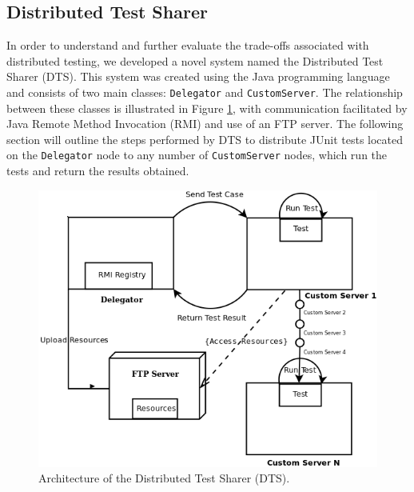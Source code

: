 \documentclass{article}
\begin{document}
{\subsection{Distributed Test Sharer}
In order to understand and further evaluate the trade-offs associated with distributed testing, we developed a novel system named the Distributed Test Sharer (DTS).  This system was created using the Java programming language and consists of two main classes: \texttt{Delegator} and \texttt{CustomServer}.  The relationship between these classes is illustrated in Figure \ref{dtsdiagram}, with communication facilitated by Java Remote Method Invocation (RMI) and use of an FTP server.  The following section will outline the steps performed by DTS to distribute JUnit tests located on the \texttt{Delegator} node to any number of \texttt{CustomServer} nodes, which run the tests and return the results obtained.

\begin{figure}[H]
\includegraphics[width = \textwidth]{DTS_Diagram.png}
\caption{Architecture of the Distributed Test Sharer (DTS).}
\label{dtsdiagram}
\end{figure}

}
\end{document}

